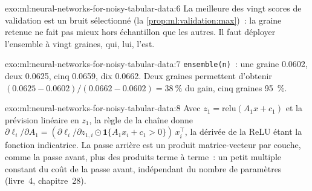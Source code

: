 \begin{solution}{exo:ml:neural-networks-for-noisy-tabular-data:6}
La meilleure des vingt scores de validation est un bruit sélectionné (la \cref{prop:ml:validation:max})~: la graine retenue ne fait pas mieux
hors échantillon que les autres. Il faut déployer l'ensemble à vingt graines, qui, lui, l'est.
\end{solution}

\begin{solution}{exo:ml:neural-networks-for-noisy-tabular-data:7}
\texttt{ensemble(n)}~: une graine 0.0602, deux 0.0625, cinq 0.0659, dix 0.0662. Deux graines permettent d'obtenir $(0.0625 - 0.0602)/(0.0662 -
0.0602) = 38~\%$ du gain, cinq graines 95~\%.
\end{solution}

\begin{solution}{exo:ml:neural-networks-for-noisy-tabular-data:8}
Avec $z_1 = \mathrm{relu}(A_1x + c_1)$ et la prévision linéaire en $z_1$, la règle de la chaîne donne $\partial\ell_i/\partial A_1 =
(\partial\ell_i/\partial z_{1,i}\odot\mathbf 1\{A_1x_i + c_1 > 0\})\,x_i^\top$, la dérivée de la ReLU étant la
fonction indicatrice. La passe arrière est un produit matrice-vecteur par couche, comme la passe avant, plus des produits terme à terme~:
un petit multiple constant du coût de la passe avant, indépendant du nombre de paramètres (livre~4, chapitre~28).
\end{solution}

